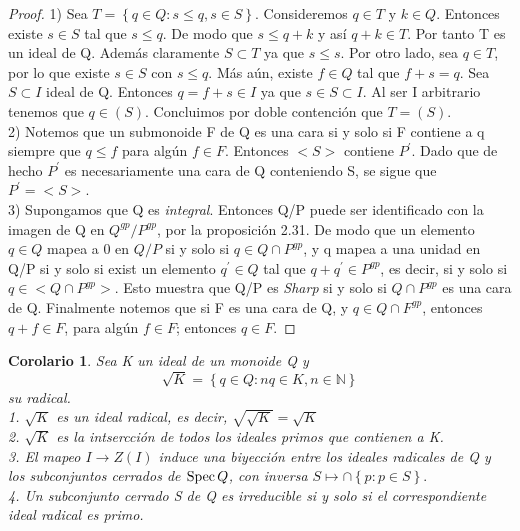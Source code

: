\documentclass[12pt,spanish]{amsart}
\newcommand{\bb}[1]{\mathbb{#1}}
\newcommand{\set}[1]{\left\{{#1}\right\}}
\def\Spec{\mathop{\mbox{\normalfont Spec}}\nolimits}
\newtheorem{cor}[Theorem]{Corolario}
\theoremstyle{definition}
\theoremstyle{remark}
\begin{document}
\begin{proof}
1) Sea $T=\set{q\in Q:s\leq q,s\in S}$. Consideremos $q\in T$ y $k\in Q$. Entonces existe $s\in S$ tal que $s\leq q$. De modo que $s\leq q+k$ y así $q+k\in T$. Por tanto T es un ideal de Q. Además claramente $S\subset T$ ya que $s\leq s$. Por otro lado, sea $q\in T$, por lo que existe $s\in S$ con $s\leq q$. Más aún, existe $f\in Q$ tal que $f+s=q$. Sea $S\subset I$ ideal de Q. Entonces $q=f+s\in I$ ya que $s\in S\subset I$. Al ser I arbitrario tenemos que $q\in (S)$. Concluimos por doble contención que $T=(S)$. \\ 

2) Notemos que un submonoide F de Q es una cara si y solo si F contiene a q siempre que $q\leq f$ para algún  $f\in F$. Entonces $<S>$ contiene $P^{\prime}$. Dado que de hecho $P^{\prime}$ es necesariamente una cara de Q conteniendo S, se sigue que $P^{\prime}=<S>.$ \\ 

3) Supongamos que Q es \textit{integral}. Entonces Q/P puede ser identificado con la imagen de Q en $Q^{gp}/P^{gp}$, por la proposición 2.31. De modo que un elemento $q\in Q$ mapea a 0 en $Q/P$ si y solo si $q\in Q\cap P^{gp}$, y q mapea a una unidad en Q/P si y solo si exist un elemento $q^{\prime}\in Q$ tal que $q+q^{\prime}\in P^{gp}$, es decir, si y solo si $q\in <Q\cap P^{gp}>$. Esto muestra que Q/P es \textit{Sharp} si y solo si $Q\cap P^{gp}$ es una cara de Q. Finalmente notemos que si F es una cara de Q, y $q\in Q\cap F^{gp}$, entonces $q+f\in F$, para algún $f\in F$; entonces $q\in F$.  
\end{proof}


\begin{cor}
Sea K un ideal de un monoide Q y 
$$\sqrt{K}=\set{q\in Q:nq\in K,n\in \bb{N}}$$
su radical. \\ 
1. $\sqrt{K}$ es un ideal radical, es decir, $\sqrt{\sqrt{K}}=\sqrt{K}$ \\ 
2. $\sqrt{K}$ es la intsercción de todos los ideales primos que contienen a K. \\ 
3. El mapeo $I \to Z(I)$ induce una biyección entre los ideales radicales de Q y los subconjuntos cerrados de $\Spec{Q}$, con inversa $S \mapsto \cap \set{p:p\in S}.$ \\
4. Un subconjunto cerrado S de Q es irreducible si y solo si el correspondiente ideal radical es primo. 
\end{cor}
\end{document}
